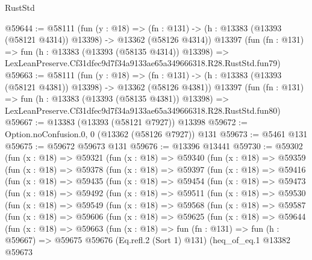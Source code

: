 \begin{lexlean}{RustStd}
\begin{coremodule}
@59644 := @58111
    (fun (y : @18) =>
    (fn : @131) -> (h : @13383 (@13393 (@58121 @4314)) @13398) -> @13362 (@58126 @4314))
    @13397
    (fun (fn : @131) =>
    fun (h : @13383 (@13393 (@58135 @4314)) @13398) =>
    LexLeanPreserve.Cf31dfec9d7f34a9133ae65a349666318.R28.RustStd.fun79)
@59663 := @58111
    (fun (y : @18) =>
    (fn : @131) -> (h : @13383 (@13393 (@58121 @4381)) @13398) -> @13362 (@58126 @4381))
    @13397
    (fun (fn : @131) =>
    fun (h : @13383 (@13393 (@58135 @4381)) @13398) =>
    LexLeanPreserve.Cf31dfec9d7f34a9133ae65a349666318.R28.RustStd.fun80)
@59667 := @13383 (@13393 (@58121 @7927)) @13398
@59672 := Option.noConfusion.{0, 0} (@13362 (@58126 @7927)) @131
@59673 := @5461 @131
@59675 := @59672 @59673 @131
@59676 := @13396 @13441
@59730 := @59302
    (fun (x : @18) =>
    @59321
      (fun (x : @18) =>
      @59340
        (fun (x : @18) =>
        @59359
          (fun (x : @18) =>
          @59378
            (fun (x : @18) =>
            @59397
              (fun (x : @18) =>
              @59416
                (fun (x : @18) =>
                @59435
                  (fun (x : @18) =>
                  @59454
                    (fun (x : @18) =>
                    @59473
                      (fun (x : @18) =>
                      @59492
                        (fun (x : @18) =>
                        @59511
                          (fun (x : @18) =>
                          @59530
                            (fun (x : @18) =>
                            @59549
                              (fun (x : @18) =>
                              @59568
                                (fun (x : @18) =>
                                @59587
                                  (fun (x : @18) =>
                                  @59606
                                    (fun (x : @18) =>
                                    @59625
                                      (fun (x : @18) =>
                                      @59644
                                        (fun (x : @18) =>
                                        @59663
                                          (fun (x : @18) =>
                                          fun (fn : @131) =>
                                          fun (h : @59667) =>
                                          @59675
                                            @59676
                                            (Eq.refl.{2} (Sort 1) @131)
                                            (heq_of_eq.{1}
                                              @13382
                                              @59673

\end{coremodule}
\end{lexlean}
